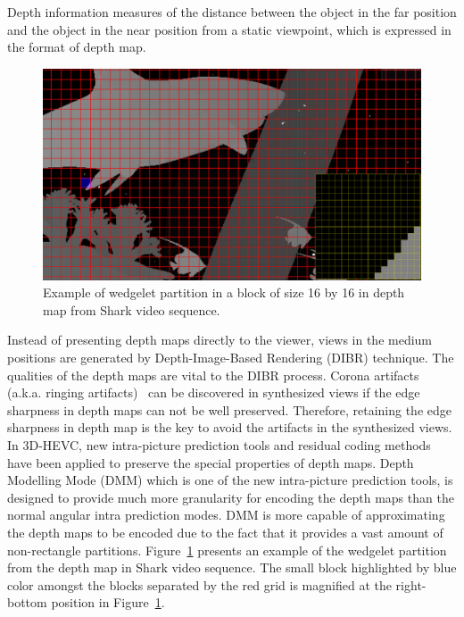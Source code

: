 Depth information measures of the distance between the object in the far position
and the object in the near position from a static viewpoint,
which is expressed in the format of depth map.
\begin{figure}[!t]
    \centering
    \includegraphics[width=\textwidth,height=\textheight,keepaspectratio]{Figures/wedgelet}
    \caption[Wedgelet partition illustration]
    {Example of wedgelet partition in a block of size 16 by 16 in depth map
    from Shark video sequence.
    }
    \label{fig:wedgelet-partition}
\end{figure}
Instead of presenting depth maps directly to the viewer, views in the medium
positions are generated by Depth-Image-Based Rendering (DIBR) technique.
The qualities of the depth maps are vital to the DIBR process.
Corona artifacts (a.k.a. ringing artifacts)~\parencite{RN44}
can be discovered in synthesized
views if the edge sharpness in depth maps can not be well
preserved.
Therefore, retaining the edge sharpness in depth map is the key to avoid the
artifacts in the synthesized views.
In 3D-HEVC, new intra-picture prediction tools and residual coding methods
have been applied to preserve the special properties of depth maps.
Depth Modelling Mode (DMM) which is one of the new intra-picture
prediction tools, is designed to provide much more granularity for
encoding the depth maps than the normal angular intra prediction modes.
DMM is more capable of approximating the depth maps to be encoded due to
the fact that it provides a vast amount of non-rectangle partitions.
Figure~\ref{fig:wedgelet-partition} presents an example of the wedgelet
partition from the depth map in Shark video sequence.
The small block highlighted by blue color amongst the blocks
separated by the red grid is magnified at the right-bottom position in
Figure~\ref{fig:wedgelet-partition}.
